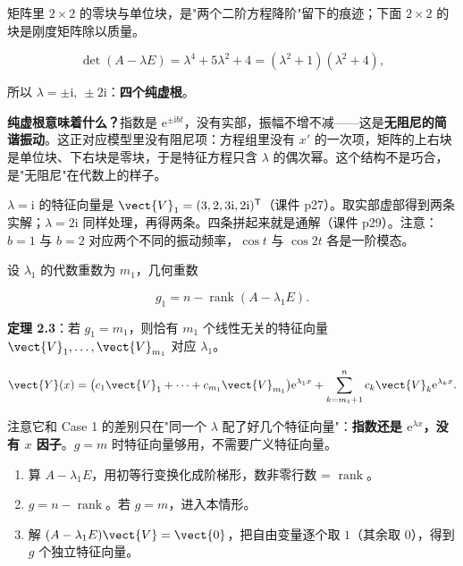 \documentclass[11pt]{ctexart}
\newcommand{\rank}{\operatorname{rank}}
\begin{document}
矩阵里 $2\times2$ 的零块与单位块，是"两个二阶方程降阶"留下的痕迹；下面 $2\times2$ 的块是刚度矩阵除以质量。



\[
\det(A-\lambda E)=\lambda^4+5\lambda^2+4=(\lambda^2+1)(\lambda^2+4),
\]

所以 $\lambda=\pm\mathrm{i},\ \pm2\mathrm{i}$：\textbf{四个纯虚根}。

\textbf{纯虚根意味着什么？}指数是 $\mathrm{e}^{\pm\mathrm{i}bt}$，没有实部，振幅不增不减——这是\textbf{无阻尼的简谐振动}。这正对应模型里没有阻尼项：方程组里没有 $x'$ 的一次项，矩阵的上右块是单位块、下右块是零块，于是特征方程只含 $\lambda$ 的偶次幂。这个结构不是巧合，是"无阻尼"在代数上的样子。


$\lambda=\mathrm{i}$ 的特征向量是 $\vect{V}_1=(3,2,3\mathrm{i},2\mathrm{i})^{\mathsf T}$（课件 p27）。取实部虚部得到两条实解；$\lambda=2\mathrm{i}$ 同样处理，再得两条。四条拼起来就是通解（课件 p29）。注意：$b=1$ 与 $b=2$ 对应两个不同的振动频率，$\cos t$ 与 $\cos2t$ 各是一阶模态。



设 $\lambda_1$ 的代数重数为 $m_1$，几何重数

\[
g_1=n-\rank(A-\lambda_1E).
\]

\textbf{定理 2.3}：若 $g_1=m_1$，则恰有 $m_1$ 个线性无关的特征向量 $\vect{V}_1,\dots,\vect{V}_{m_1}$ 对应 $\lambda_1$。


\[
\vect{Y}(x)=\bigl(c_1\vect{V}_1+\cdots+c_{m_1}\vect{V}_{m_1}\bigr)\mathrm{e}^{\lambda_1x}
+\sum_{k=m_1+1}^{n}c_k\vect{V}_k\mathrm{e}^{\lambda_kx}.
\]

注意它和 Case 1 的差别只在"同一个 $\lambda$ 配了好几个特征向量"：\textbf{指数还是 $\mathrm{e}^{\lambda x}$，没有 $x$ 因子}。$g=m$ 时特征向量够用，不需要广义特征向量。


\begin{enumerate}
  \item 算 $A-\lambda_1E$，用初等行变换化成阶梯形，数非零行数 = $\rank$。
  \item $g=n-\rank$。若 $g=m$，进入本情形。
  \item 解 $(A-\lambda_1E)\vect{V}=\vect{0}$，把自由变量逐个取 $1$（其余取 $0$），得到 $g$ 个独立特征向量。
\end{enumerate}
\end{document}
